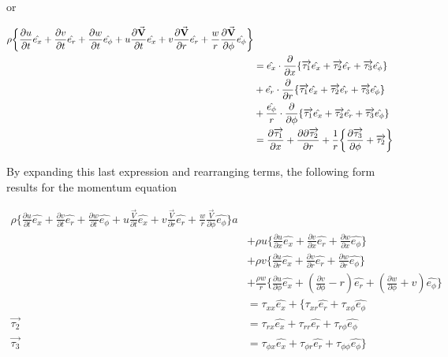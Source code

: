 or

\begin{equation}
  \begin{aligned}
  \rho \bigg\{ 
      \pdv{u}{t}\hat{e_x} 
    + \pdv{v}{t}\hat{e_r}
    + \pdv{w}{t}\hat{e_\phi} 
    + u\pdv{\va{V}}{t}\hat{e_x}
    + v\pdv{\va{V}}{r}\hat{e_r}
    + \frac{w}{r}\pdv{\va{V}}{\phi}\hat{e_\phi}
  \bigg\} \\
  &= \hat{e_x}\cdot\pdv{x}
  \{
      \overrightarrow{\tau_1}\hat{e_x}
    + \overrightarrow{\tau_2}\hat{e_r}
    + \overrightarrow{\tau_3}\hat{e_\phi}
  \} \\
  &+ \hat{e_r}\cdot\pdv{r}
  \{
      \overrightarrow{\tau_1}\hat{e_x}
    + \overrightarrow{\tau_2}\hat{e_r}
    + \overrightarrow{\tau_3}\hat{e_\phi}
  \} \\
  &+ \frac{\hat{e_\phi}}{r}\cdot\pdv{\phi}
  \{
      \overrightarrow{\tau_1}\hat{e_x}
    + \overrightarrow{\tau_2}\hat{e_r}
    + \overrightarrow{\tau_3}\hat{e_\phi}
  \} \\
  &= \pdv{\overrightarrow{\tau_1}}{x} 
    + \pdv{\partial\overrightarrow{\tau_2}}{r} 
    + \frac{1}{r} 
    \bigg\{
      \pdv{\overrightarrow{\tau_3}}{\phi}  
      + \overrightarrow{\tau_2}
    \bigg\}
  \end{aligned}
\end{equation}

By expanding this last expression and rearranging terms, the following form
results for the momentum equation

\begin{equation}
  \begin{aligned}
\rho \bigg\{ 
      \frac{\partial u}{\partial t}\hat{e_x} 
    + \frac{\partial v}{\partial t}\hat{e_r}
    + \frac{\partial w}{\partial t}\hat{e_\phi} 
    + u\frac{\overrightarrow{V}}{\partial t}\hat{e_x}
    + v\frac{\overrightarrow{V}}{\partial r}\hat{e_r}
    + \frac{w}{r}\frac{\overrightarrow{V}}{\partial \phi}\hat{e_\phi}
  \bigg\}a \\
    &+ \rho u \bigg\{
    \frac{\partial u}{\partial x}\hat{e_x} 
    + \frac{\partial v}{\partial x}\hat{e_r}
    + \frac{\partial w}{\partial x}\hat{e_\phi} \bigg\}\\
  &+ \rho v \bigg\{
    \frac{\partial u}{\partial r}\hat{e_x} 
    + \frac{\partial v}{\partial r}\hat{e_r}
    + \frac{\partial w}{\partial r}\hat{e_\phi} \bigg\}\\
  &+ \frac{\rho w}{r} \bigg\{
    \frac{\partial u}{\partial \phi}\hat{e_x} 
    + \left(\frac{\partial v}{\partial \phi}-r\right)\hat{e_r}
    + \left(\frac{\partial w}{\partial \phi}+v\right)\hat{e_\phi} \bigg\} \\
  &= \tau_{xx}\hat{e_x}
    + \bigg\{\tau_{xr}\hat{e_r}
    + \tau_{x\phi}\hat{e_\phi} \\
     \overrightarrow{\tau_2} 
    &= \tau_{rx}\hat{e_x}
    + \tau_{rr}\hat{e_r}
    + \tau_{r\phi}\hat{e_\phi} \\
     \overrightarrow{\tau_3} 
    &= \tau_{\phi x}\hat{e_x}
    + \tau_{\phi r}\hat{e_r}
    + \tau_{\phi\phi}\hat{e_\phi} \bigg\}
  \end{aligned}
\end{equation}


